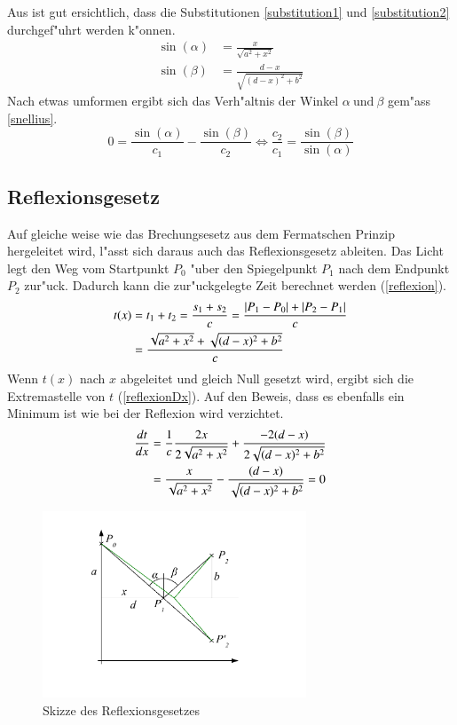 Aus  ist gut ersichtlich, dass die Substitutionen \ref{substitution1} und \ref{substitution2} durchgef"uhrt werden k"onnen.
\begin{align}
	\sin(\alpha) &= \frac{x}{\sqrt{a^2 + x^2}}  \label{substitution1}\\
	\sin(\beta) &= \frac{d-x}{\sqrt{(d -x)^2 + b^2}} \label{substitution2}
\end{align}
Nach etwas umformen ergibt sich das Verh"altnis der Winkel $\alpha \ \text{und} \ \beta$ gem"ass \eqref{snellius}.
\begin{equation}
	0 = \frac{\sin(\alpha)}{c_1} - \frac{\sin(\beta)}{c_2} \Leftrightarrow\frac{c_2}{c_1} = \frac{\sin(\beta)}{\sin(\alpha)}
	\label{snellius}
\end{equation}
\subsection{Reflexionsgesetz}
Auf gleiche weise wie das Brechungsesetz aus dem Fermatschen Prinzip hergeleitet wird, 
l"asst sich daraus auch das Reflexionsgesetz ableiten.
Das Licht legt den Weg vom Startpunkt $P_0$ "uber den Spiegelpunkt $P_1$ 
nach dem Endpunkt $P_2$ zur"uck. Dadurch kann die zur"uckgelegte Zeit berechnet werden \cite{Wikipedia} (\eqref{reflexion}).
\begin{align}
t(x) &= t_1 + t_2 = \frac{s_1 + s_2}{c} = \frac{|P_1 - P_0| + |P_2 - P_1|}{c} \notag \\
&= \frac{\sqrt{a^2 + x^2} + \sqrt{(d-x)^2 + b^2}}{c} \label{reflexion}
\end{align}
Wenn $t(x)$ nach $x$ abgeleitet und gleich Null gesetzt wird, ergibt sich die Extremastelle  von $t$ (\eqref{reflexionDx}). Auf den Beweis, dass es ebenfalls ein Minimum ist wie bei der Reflexion wird verzichtet.
\begin{align}
\frac{dt}{dx} &= \frac{1}{c}  \frac{2  x}{2  \sqrt{a^2 + x^2}} + \frac{-2  (d-x)}{2  \sqrt{(d-x)^2 + b^2}} \notag \\
&= \frac{x}{ \sqrt{a^2 + x^2}} - \frac{(d-x)}{ \sqrt{(d-x)^2 + b^2}} = 0 \label{reflexionDx}
\end{align}
\begin{figure}[H]
\begin{center}
	\includegraphics[width=0.7\textwidth]{licht/picture/Spiegelung.pdf}
	\caption{Skizze des Reflexionsgesetzes}
	\label{Ab:spiegelung}
\end{center}
\end{figure}

